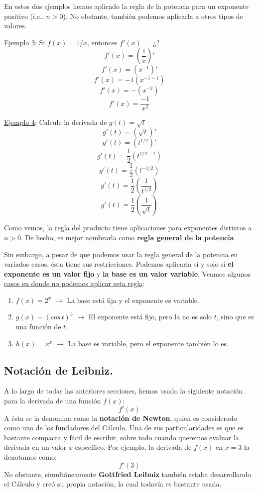 \documentclass[12pt]{article}
\begin{document}
En estos dos ejemplos hemos aplicado la regla de la potencia para un exponente positivo (i.e., $n > 0$). No obstante, también podemos aplicarla a otros tipos de valores.

\underline{Ejemplo 3}: Si $f(x) = 1/x$, entonces $f'(x) =$ ¿?
\[f'(x) = \left(\frac{1}{x}\right)'\]
\[f'(x) = (x^{-1})'\]
\[f'(x) = -1(x^{-1-1})\]
\[f'(x) = -(x^{-2})\]
\[f'(x) = \frac{-1}{x^{2}}\]

\underline{Ejemplo 4}: Calcule la derivada de $g(t) = \sqrt{t}$
\[g'(t) = (\sqrt{t})'\]
\[g'(t) = (t^{1/2})'\]
\[g'(t) = \frac{1}{2}(t^{1/2 - 1})\]
\[g'(t) = \frac{1}{2}(t^{-1/2})\]
\[g'(t) = \frac{1}{2}\left(\frac{1}{t^{1/2}}\right)\]
\[g'(t) = \frac{1}{2}\left(\frac{1}{\sqrt{t}}\right)\]

Como vemos, la regla del producto tiene aplicaciones para exponentes distintos a $n > 0$. De hecho, es mejor nombrarla como \textbf{regla \underline{general} de la potencia}.

Sin embargo, a pesar de que podemos usar la regla general de la potencia en variados casos, ésta tiene sus restricciones. Podemos aplicarla sí y solo sí \textbf{el exponente es un valor fijo} y \textbf{la base es un valor variable}. Veamos algunos \underline{casos en donde no podemos aplicar esta regla}:

\begin{enumerate}
\item $f(x) = 2^{x}$ $\rightarrow$ La base está fija y el exponente es variable.
\item $g(x) = (cos \, t)^{3}$ $\rightarrow$ El exponente está fijo, pero la no es solo $t$, sino que es una función de $t$.
\item $h(x) = x^{x}$ $\rightarrow$ La base es variable, pero el exponente también lo es.
\end{enumerate}



\subsection{Notación de Leibniz.}

A lo largo de todas las anteriores secciones, hemos usado la siguiente notación para la derivada de una función $f(x)$:
\[f'(x)\]
A ésta se la denomina como la \textbf{notación de Newton}, quien es considerado como uno de los fundadores del Cálculo. Una de sus particularidades es que es bastante compacta y fácil de escribir, sobre todo cuando queremos evaluar la derivada en un valor $x$ específico. Por ejemplo, la derivada de $f(x)$ en $x = 3$ la denotamos como:
\[f'(3)\]
No obstante, simultáneamente \textbf{Gottfried Leibniz} también estaba desarrollando el Cálculo y creó su propia notación, la cual todavía es bastante usada.
\end{document}
